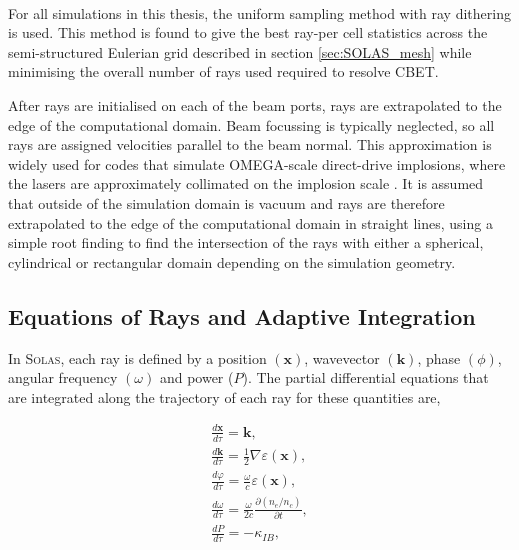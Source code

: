 \paragraph*{}
For all simulations in this thesis, the uniform sampling method with ray dithering is used.
This method is found to give the best ray-per cell statistics across the semi-structured Eulerian grid described in section \ref{sec:SOLAS_mesh} while minimising the overall number of rays used required to resolve \ac{CBET}.

After rays are initialised on each of the beam ports, rays are extrapolated to the edge of the computational domain.
Beam focussing is typically neglected, so all rays are assigned velocities parallel to the beam normal.
This approximation is widely used for codes that simulate OMEGA-scale direct-drive implosions, where the lasers are approximately collimated on the implosion scale \cite{colaitis_inverse_2021,marozas_wavelength-detuning_2018}.
It is assumed that outside of the simulation domain is vacuum and rays are therefore extrapolated to the edge of the computational domain in straight lines, using a simple root finding to find the intersection of the rays with either a spherical, cylindrical or rectangular domain depending on the simulation geometry.

\subsection{Equations of Rays and Adaptive Integration}
\label{sec:SOLAS_ray_propagation}

In \textsc{Solas}, each ray is defined by a position $(\mathbf{x})$, wavevector $(\mathbf{k})$, phase $(\phi)$, angular frequency $(\omega)$ and power ($P$).
The partial differential equations that are integrated along the trajectory of each ray for these quantities are,

\begin{equation}
    \label{eq:SOLAS_rays}
    \begin{gathered}
        \frac{d \mathbf{x}}{d \tau}=\mathbf{k}, \\
        \frac{d \mathbf{k}}{d \tau}=\frac{1}{2} \nabla \varepsilon(\mathbf{x}), \\
        \frac{d \varphi}{d \tau}=\frac{\omega}{c} \varepsilon(\mathbf{x}), \\
        \frac{d \omega}{d \tau}=\frac{\omega}{2 c} \frac{\partial\left(n_e / n_c\right)}{\partial t}, \\
        \frac{d P}{d \tau}=-\kappa_{IB},
    \end{gathered}
\end{equation}

